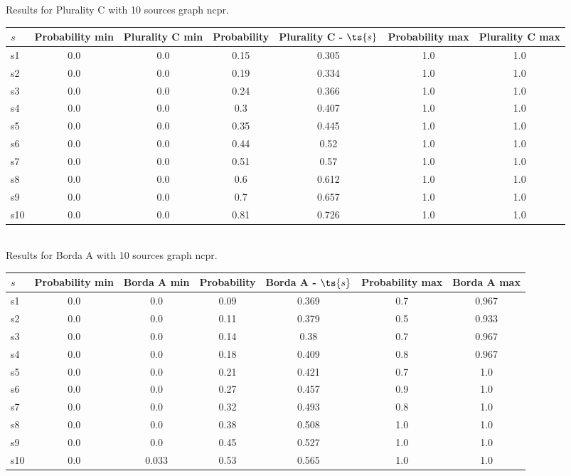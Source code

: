 \documentclass{article}
\begin{document}
\noindent Results for Plurality C with 10 sources graph ncpr.

\noindent\begin{tabular}{|l|c|c|c|c|c|c|}
\hline
$s$& Probability min & Plurality C min & Probability & Plurality C - $\ts{s}$ & Probability max & Plurality C max\\
\hline
s1 &0.0 & 0.0 & 0.15 & 0.305 & 1.0 & 1.0\\
\hline
s2 &0.0 & 0.0 & 0.19 & 0.334 & 1.0 & 1.0\\
\hline
s3 &0.0 & 0.0 & 0.24 & 0.366 & 1.0 & 1.0\\
\hline
s4 &0.0 & 0.0 & 0.3 & 0.407 & 1.0 & 1.0\\
\hline
s5 &0.0 & 0.0 & 0.35 & 0.445 & 1.0 & 1.0\\
\hline
s6 &0.0 & 0.0 & 0.44 & 0.52 & 1.0 & 1.0\\
\hline
s7 &0.0 & 0.0 & 0.51 & 0.57 & 1.0 & 1.0\\
\hline
s8 &0.0 & 0.0 & 0.6 & 0.612 & 1.0 & 1.0\\
\hline
s9 &0.0 & 0.0 & 0.7 & 0.657 & 1.0 & 1.0\\
\hline
s10 &0.0 & 0.0 & 0.81 & 0.726 & 1.0 & 1.0\\
\hline
\end{tabular}\\

\noindent Results for Borda A with 10 sources graph ncpr.

\noindent\begin{tabular}{|l|c|c|c|c|c|c|}
\hline
$s$& Probability min & Borda A min & Probability & Borda A - $\ts{s}$ & Probability max & Borda A max\\
\hline
s1 &0.0 & 0.0 & 0.09 & 0.369 & 0.7 & 0.967\\
\hline
s2 &0.0 & 0.0 & 0.11 & 0.379 & 0.5 & 0.933\\
\hline
s3 &0.0 & 0.0 & 0.14 & 0.38 & 0.7 & 0.967\\
\hline
s4 &0.0 & 0.0 & 0.18 & 0.409 & 0.8 & 0.967\\
\hline
s5 &0.0 & 0.0 & 0.21 & 0.421 & 0.7 & 1.0\\
\hline
s6 &0.0 & 0.0 & 0.27 & 0.457 & 0.9 & 1.0\\
\hline
s7 &0.0 & 0.0 & 0.32 & 0.493 & 0.8 & 1.0\\
\hline
s8 &0.0 & 0.0 & 0.38 & 0.508 & 1.0 & 1.0\\
\hline
s9 &0.0 & 0.0 & 0.45 & 0.527 & 1.0 & 1.0\\
\hline
s10 &0.0 & 0.033 & 0.53 & 0.565 & 1.0 & 1.0\\
\hline
\end{tabular}\\
\end{document}
